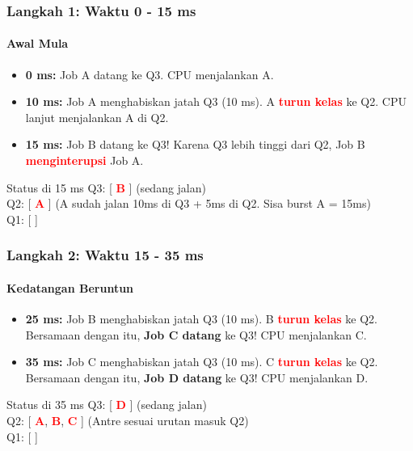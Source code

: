 \documentclass[t,aspectratio=169,xcolor=dvipsnames]{beamer}
\newcommand{\tem}[1]{\textbf{\textcolor{red}{#1}}}
\begin{document}
\begin{frame}
    \frametitle{Langkah 1: Waktu 0 - 15 ms}
    \framesubtitle{Awal Mula}
    \small
    \begin{itemize}
        \item \textbf{0 ms:} Job A datang ke Q3. CPU menjalankan A.
        \item \textbf{10 ms:} Job A menghabiskan jatah Q3 (10 ms). A \tem{turun kelas} ke Q2. CPU lanjut menjalankan A di Q2.
        \item \textbf{15 ms:} Job B datang ke Q3! Karena Q3 lebih tinggi dari Q2, Job B \tem{menginterupsi} Job A.
    \end{itemize}
    \vspace{0.3cm}
    \begin{exampleblock}{Status di 15 ms}
        Q3: [ \tem{B} ] (sedang jalan) \\
        Q2: [ \tem{A} ] (A sudah jalan 10ms di Q3 + 5ms di Q2. Sisa burst A = 15ms) \\
        Q1: [ ]
    \end{exampleblock}
\end{frame}

\begin{frame}
    \frametitle{Langkah 2: Waktu 15 - 35 ms}
    \framesubtitle{Kedatangan Beruntun}
    \footnotesize
    \begin{itemize}
        \item \textbf{25 ms:} Job B menghabiskan jatah Q3 (10 ms). B \tem{turun kelas} ke Q2. Bersamaan dengan itu, \textbf{Job C datang} ke Q3! CPU menjalankan C.
        \item \textbf{35 ms:} Job C menghabiskan jatah Q3 (10 ms). C \tem{turun kelas} ke Q2. Bersamaan dengan itu, \textbf{Job D datang} ke Q3! CPU menjalankan D.
    \end{itemize}
    \vspace{0.3cm}
    \begin{exampleblock}{Status di 35 ms}
        Q3: [ \tem{D} ] (sedang jalan) \\
        Q2: [ \tem{A}, \tem{B}, \tem{C} ] (Antre sesuai urutan masuk Q2) \\
        Q1: [ ]
    \end{exampleblock}
\end{frame}
\end{document}
